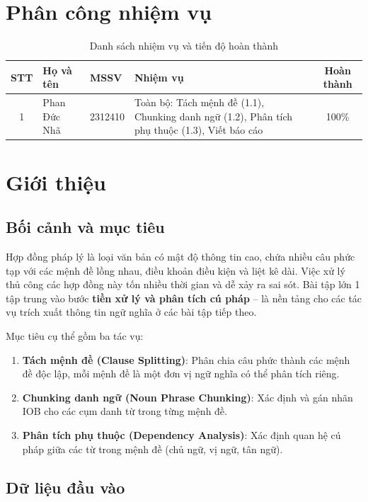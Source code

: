 \section{Phân công nhiệm vụ}
\begin{table}[H]
    \centering
    \renewcommand{\arraystretch}{1.3}
    \caption{Danh sách nhiệm vụ và tiến độ hoàn thành}
    \label{tab:phancong_btl1}
    \begin{tabularx}{\textwidth}{|c|l|l|X|c|}
        \hline
        \textbf{STT} & \textbf{Họ và tên} & \textbf{MSSV} & \textbf{Nhiệm vụ} & \textbf{Hoàn thành} \\ \hline
        1 & Phan Đức Nhã & 2312410 & 
        Toàn bộ: Tách mệnh đề (1.1), Chunking danh ngữ (1.2), Phân tích phụ thuộc (1.3), Viết báo cáo & 100\% \\ \hline
    \end{tabularx}
\end{table}

\section{Giới thiệu}

\subsection{Bối cảnh và mục tiêu}

Hợp đồng pháp lý là loại văn bản có mật độ thông tin cao, chứa nhiều câu phức tạp với các mệnh đề lồng nhau, điều khoản điều kiện và liệt kê dài. Việc xử lý thủ công các hợp đồng này tốn nhiều thời gian và dễ xảy ra sai sót. Bài tập lớn 1 tập trung vào bước \textbf{tiền xử lý và phân tích cú pháp} -- là nền tảng cho các tác vụ trích xuất thông tin ngữ nghĩa ở các bài tập tiếp theo.

Mục tiêu cụ thể gồm ba tác vụ:
\begin{enumerate}
    \item \textbf{Tách mệnh đề (Clause Splitting)}: Phân chia câu phức thành các mệnh đề độc lập, mỗi mệnh đề là một đơn vị ngữ nghĩa có thể phân tích riêng.
    \item \textbf{Chunking danh ngữ (Noun Phrase Chunking)}: Xác định và gán nhãn IOB cho các cụm danh từ trong từng mệnh đề.
    \item \textbf{Phân tích phụ thuộc (Dependency Analysis)}: Xác định quan hệ cú pháp giữa các từ trong mệnh đề (chủ ngữ, vị ngữ, tân ngữ).
\end{enumerate}

\subsection{Dữ liệu đầu vào}


